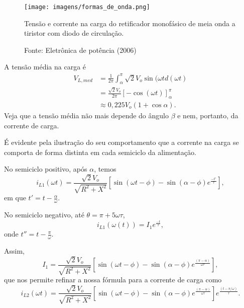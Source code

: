 \begin{figure}[h]
\center
\texttt{[image: imagens/formas\_de\_onda.png]}
\caption{Tensão e corrente na carga do retificador monofásico de meia onda a tiristor com diodo de circulação.}\label{gdc}
\caption*{Fonte: Eletrônica de potência (2006)}
\end{figure}

A tensão média na carga é 
\begin{align*}
    V_{L,med} &= \frac{1}{2\pi}\int_{\alpha}^{\pi}\sqrt{2}V_{o}\sin(\omega{t}d(\omega{t}) \\
&= \frac{\sqrt{2}V_{o}}{2\pi}[-\cos(\omega{t})]_{\alpha}^{\pi} \\
&\approx 0,225V_{o}(1+\cos\alpha)
.\end{align*}
Veja que a tensão média não mais depende do ângulo $\beta$ e nem, portanto, da corrente de carga.

É evidente pela ilustração do seu comportamento que a corrente na carga se comporta de forma distinta em cada semiciclo da alimentação.

No semiciclo positivo, após $\alpha$, temos \[
i_{L1}(\omega{t}) = \frac{\sqrt{2}V_{o}}{\sqrt{R^2+X^2}}[\sin(\omega{t}-\phi)-\sin(\alpha-\phi)e^\frac{-t'}{\tau}]
,\] em que $t'=t-\frac{\alpha}{\omega}$.

No semiciclo negativo, até $\theta=\pi+5\omega \tau$,\[
i_{L1}(\omega(t)) = I_{1}e{^\frac{-t}{\tau}}
,\] onde $t''=t-\frac{\pi}{\omega}$.

Assim, \[
I_{1} = \frac{\sqrt{2}V_{o}}{\sqrt{R^2+X^2}}[\sin(\omega{t}-\phi)-\sin(\alpha-\phi)e^\frac{(\pi-\alpha)}{\omega\tau}]
,\] que nos permite refinar a nossa fórmula para a corrente de carga como \[
i_{L2}(\omega{t}) = \frac{\sqrt{2}V_{o}}{\sqrt{R^2+X^2}}[\sin(\omega{t}-\phi)-\sin(\alpha-\phi)e^\frac{(\pi-\alpha)}{\omega\tau}]e^\frac{(t-\pi/\omega)}{\tau}
.\] 

